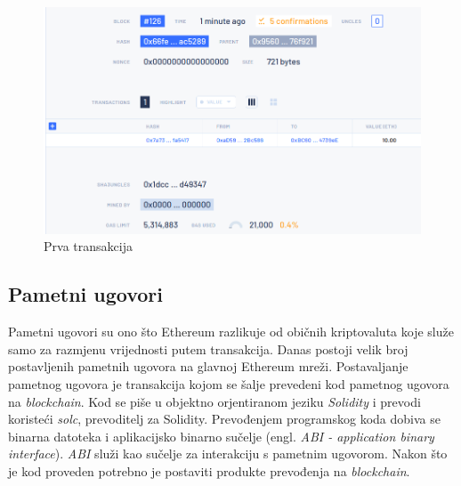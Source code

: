 \documentclass[times, utf8, zavrsni]{fer}
\begin{document}
\pagebreak

\begin{figure}[ht]
  \includegraphics[width=\textwidth]{blocktx.png}
  \caption{Prva transakcija}
  \centering
  \vfill
\end{figure}

\subsection{Pametni ugovori}
Pametni ugovori su ono što Ethereum razlikuje od običnih kriptovaluta koje služe samo za razmjenu vrijednosti putem transakcija. Danas postoji velik broj postavljenih 
pametnih ugovora na glavnoj Ethereum mreži. Postavaljanje pametnog ugovora je transakcija kojom se šalje prevedeni kod pametnog ugovora na \emph{blockchain}.
Kod se piše u objektno orjentiranom jeziku \emph{Solidity} i prevodi koristeći \emph{solc}, prevoditelj za Solidity. Prevođenjem programskog koda dobiva se binarna datoteka
i aplikacijsko binarno sučelje (engl. \emph{ABI - application binary interface}). \emph{ABI} služi kao sučelje za interakciju s pametnim ugovorom. Nakon što je kod
proveden potrebno je postaviti produkte prevođenja na \emph{blockchain}.
\end{document}
